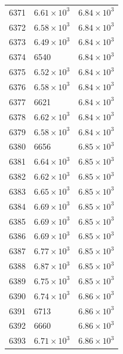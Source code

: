 \begin{table}[H]
\begin{tabular}{lll}
6371 & $\displaystyle 6.61 \times 10^{3}$ & $\displaystyle 6.84 \times 10^{3}$ \\
6372 & $\displaystyle 6.58 \times 10^{3}$ & $\displaystyle 6.84 \times 10^{3}$ \\
6373 & $\displaystyle 6.49 \times 10^{3}$ & $\displaystyle 6.84 \times 10^{3}$ \\
6374 & 6540 & $\displaystyle 6.84 \times 10^{3}$ \\
6375 & $\displaystyle 6.52 \times 10^{3}$ & $\displaystyle 6.84 \times 10^{3}$ \\
6376 & $\displaystyle 6.58 \times 10^{3}$ & $\displaystyle 6.84 \times 10^{3}$ \\
6377 & 6621 & $\displaystyle 6.84 \times 10^{3}$ \\
6378 & $\displaystyle 6.62 \times 10^{3}$ & $\displaystyle 6.84 \times 10^{3}$ \\
6379 & $\displaystyle 6.58 \times 10^{3}$ & $\displaystyle 6.84 \times 10^{3}$ \\
6380 & 6656 & $\displaystyle 6.85 \times 10^{3}$ \\
6381 & $\displaystyle 6.64 \times 10^{3}$ & $\displaystyle 6.85 \times 10^{3}$ \\
6382 & $\displaystyle 6.62 \times 10^{3}$ & $\displaystyle 6.85 \times 10^{3}$ \\
6383 & $\displaystyle 6.65 \times 10^{3}$ & $\displaystyle 6.85 \times 10^{3}$ \\
6384 & $\displaystyle 6.69 \times 10^{3}$ & $\displaystyle 6.85 \times 10^{3}$ \\
6385 & $\displaystyle 6.69 \times 10^{3}$ & $\displaystyle 6.85 \times 10^{3}$ \\
6386 & $\displaystyle 6.69 \times 10^{3}$ & $\displaystyle 6.85 \times 10^{3}$ \\
6387 & $\displaystyle 6.77 \times 10^{3}$ & $\displaystyle 6.85 \times 10^{3}$ \\
6388 & $\displaystyle 6.87 \times 10^{3}$ & $\displaystyle 6.85 \times 10^{3}$ \\
6389 & $\displaystyle 6.75 \times 10^{3}$ & $\displaystyle 6.85 \times 10^{3}$ \\
6390 & $\displaystyle 6.74 \times 10^{3}$ & $\displaystyle 6.86 \times 10^{3}$ \\
6391 & 6713 & $\displaystyle 6.86 \times 10^{3}$ \\
6392 & 6660 & $\displaystyle 6.86 \times 10^{3}$ \\
6393 & $\displaystyle 6.71 \times 10^{3}$ & $\displaystyle 6.86 \times 10^{3}$ \\

\end{tabular}
\end{table}
